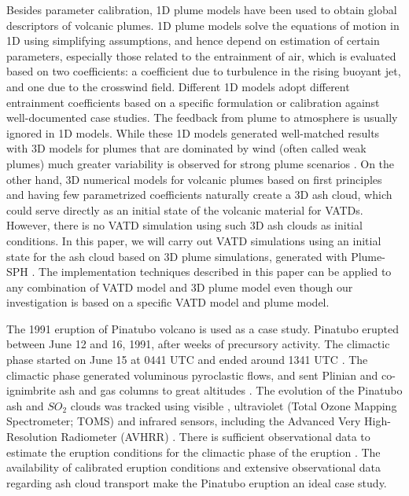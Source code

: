 \documentclass[utf8]{frontiersSCNS} %
\begin{document}
Besides parameter calibration, 1D plume models have been used to obtain global descriptors of volcanic plumes. 1D plume models \citep [e.g.][]{woods1988fluid, bursik2001effect, mastin2007user, de2015plume, folch2016fplume, pouget2016sensitivity} solve the equations of motion in 1D using simplifying assumptions, and hence depend on estimation of certain parameters, especially those related to the entrainment of air, which is evaluated based on two coefficients: a coefficient due to turbulence in the rising buoyant jet, and one due to the crosswind field. Different 1D models adopt different entrainment coefficients based on a specific formulation or calibration against well-documented case studies. The feedback from plume to atmosphere is usually ignored in 1D models. While these 1D models generated well-matched results with 3D models for plumes that are dominated by wind (often called weak plumes) much greater variability is observed for strong plume scenarios \citep{bursik2009volcanic, costa2016results}. On the other hand, 3D numerical models for volcanic plumes based on first principles and having few parametrized coefficients \citep{oberhuber1998volcanic, neri2003multiparticle, suzuki2005numerical, cerminara2016ashee, cao2018plume} naturally create a 3D ash cloud, which could serve directly as an initial state of the volcanic material for VATDs. However, there is no VATD simulation using such 3D ash clouds as initial conditions. In this paper, we will carry out VATD simulations using an initial state for the ash cloud based on 3D plume simulations, generated with Plume-SPH \citep{cao2018plume, cao2017data}. The implementation techniques described in this paper can be applied to any combination of VATD model and 3D plume model even though our investigation is based on a specific VATD model and plume model.

The 1991 eruption of Pinatubo volcano is used as a case study. Pinatubo erupted between June 12 and 16, 1991, after weeks of precursory activity. The climactic phase started on June 15 at 0441 UTC and ended around 1341 UTC \citep{holasek1996satellite}. The climactic phase generated voluminous pyroclastic flows, and sent Plinian and co-ignimbrite ash and gas columns to great altitudes \citep{scott1996pyroclastic}. The evolution of the Pinatubo ash and $SO_2$ clouds was tracked using visible \citep{holasek1996satellite}, ultraviolet (Total Ozone Mapping Spectrometer; TOMS) \citep{guo2004re} and infrared sensors, including the Advanced Very High-Resolution Radiometer (AVHRR) \citep{guo2004particles}. There is sufficient observational data to estimate the eruption conditions for the climactic phase of the eruption \citep{suzuki2009three}. The availability of calibrated eruption conditions and extensive observational data regarding ash cloud transport make the Pinatubo eruption an ideal case study.
\end{document}
